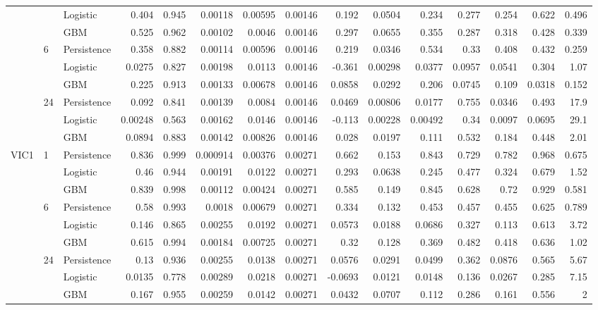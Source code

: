 \begin{tabular}{lllrrrrrrrrrrrr}
 &  & Logistic & 0.404 & 0.945 & 0.00118 & 0.00595 & 0.00146 & 0.192 & 0.0504 & 0.234 & 0.277 & 0.254 & 0.622 & 0.496 \\
 &  & GBM & 0.525 & 0.962 & 0.00102 & 0.0046 & 0.00146 & 0.297 & 0.0655 & 0.355 & 0.287 & 0.318 & 0.428 & 0.339 \\
\cline{2-15}
 & \multirow[t]{3}{*}{6} & Persistence & 0.358 & 0.882 & 0.00114 & 0.00596 & 0.00146 & 0.219 & 0.0346 & 0.534 & 0.33 & 0.408 & 0.432 & 0.259 \\
 &  & Logistic & 0.0275 & 0.827 & 0.00198 & 0.0113 & 0.00146 & -0.361 & 0.00298 & 0.0377 & 0.0957 & 0.0541 & 0.304 & 1.07 \\
 &  & GBM & 0.225 & 0.913 & 0.00133 & 0.00678 & 0.00146 & 0.0858 & 0.0292 & 0.206 & 0.0745 & 0.109 & 0.0318 & 0.152 \\
\cline{2-15}
 & \multirow[t]{3}{*}{24} & Persistence & 0.092 & 0.841 & 0.00139 & 0.0084 & 0.00146 & 0.0469 & 0.00806 & 0.0177 & 0.755 & 0.0346 & 0.493 & 17.9 \\
 &  & Logistic & 0.00248 & 0.563 & 0.00162 & 0.0146 & 0.00146 & -0.113 & 0.00228 & 0.00492 & 0.34 & 0.0097 & 0.0695 & 29.1 \\
 &  & GBM & 0.0894 & 0.883 & 0.00142 & 0.00826 & 0.00146 & 0.028 & 0.0197 & 0.111 & 0.532 & 0.184 & 0.448 & 2.01 \\
\cline{1-15} \cline{2-15}
\multirow[t]{9}{*}{VIC1} & \multirow[t]{3}{*}{1} & Persistence & 0.836 & 0.999 & 0.000914 & 0.00376 & 0.00271 & 0.662 & 0.153 & 0.843 & 0.729 & 0.782 & 0.968 & 0.675 \\
 &  & Logistic & 0.46 & 0.944 & 0.00191 & 0.0122 & 0.00271 & 0.293 & 0.0638 & 0.245 & 0.477 & 0.324 & 0.679 & 1.52 \\
 &  & GBM & 0.839 & 0.998 & 0.00112 & 0.00424 & 0.00271 & 0.585 & 0.149 & 0.845 & 0.628 & 0.72 & 0.929 & 0.581 \\
\cline{2-15}
 & \multirow[t]{3}{*}{6} & Persistence & 0.58 & 0.993 & 0.0018 & 0.00679 & 0.00271 & 0.334 & 0.132 & 0.453 & 0.457 & 0.455 & 0.625 & 0.789 \\
 &  & Logistic & 0.146 & 0.865 & 0.00255 & 0.0192 & 0.00271 & 0.0573 & 0.0188 & 0.0686 & 0.327 & 0.113 & 0.613 & 3.72 \\
 &  & GBM & 0.615 & 0.994 & 0.00184 & 0.00725 & 0.00271 & 0.32 & 0.128 & 0.369 & 0.482 & 0.418 & 0.636 & 1.02 \\
\cline{2-15}
 & \multirow[t]{3}{*}{24} & Persistence & 0.13 & 0.936 & 0.00255 & 0.0138 & 0.00271 & 0.0576 & 0.0291 & 0.0499 & 0.362 & 0.0876 & 0.565 & 5.67 \\
 &  & Logistic & 0.0135 & 0.778 & 0.00289 & 0.0218 & 0.00271 & -0.0693 & 0.0121 & 0.0148 & 0.136 & 0.0267 & 0.285 & 7.15 \\
 &  & GBM & 0.167 & 0.955 & 0.00259 & 0.0142 & 0.00271 & 0.0432 & 0.0707 & 0.112 & 0.286 & 0.161 & 0.556 & 2 \\
\cline{1-15} \cline{2-15}
\bottomrule
\end{tabular}
